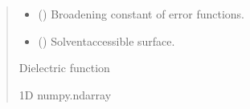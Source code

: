 \documentclass[letterpaper,10pt,english]{sphinxmanual}
\begin{document}
\begin{fulllineitems}
\begin{quote}
\begin{description}
\begin{itemize}
\item {} 
\sphinxAtStartPar
{} () \textendash{} Broadening constant of error functions.

\item {} 
\sphinxAtStartPar
{} () \textendash{} Solvent\sphinxhyphen{}accessible surface.

\end{itemize}

\sphinxAtStartPar
Dielectric function

\sphinxAtStartPar
1D numpy.ndarray

\end{description}\end{quote}

\end{fulllineitems}

\end{document}
